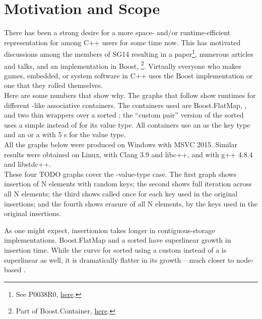 \section{Motivation and Scope}

There has been a strong desire for a more space- and/or runtime-efficient
representation for  among C++ users for some time now.  This has
motivated discussions among the members of SG14 resulting in a
paper\footnote{See P0038R0,
  \href{http://www.open-std.org/jtc1/sc22/wg21/docs/papers/2015/p0038r0.html}{here}.},
numerous articles and talks, and an implementation in Boost,
\footnote{Part of Boost.Container,
  \href{http://www.boost.org/doc/libs/1_61_0/doc/html/container.html}{here}.}.
Virtually everyone who makes games, embedded, or system software in C++ uses
the Boost implementation or one that they rolled themselves.\\

Here are some numbers that show why.  The graphs that follow show runtimes for
different -like associative containers.  The containers used are
Boost.FlatMap, , and two thin wrappers over a sorted ;
the ``custom pair'' version of the sorted  uses a simple
 instead of  for its value type.  All containers use
an  as the key type and an  or a  with 5
s for the value type.\\

All the graphs below were produced on Windows with MSVC 2015.  Similar results
were obtained on Linux, with Clang 3.9 and libc++, and with g++ 4.8.4 and
libstdc++.\\

These four TODO graphs cover the -value-type case.  The first graph
shows insertion of N elements with random keys; the second shows full
iteration across all N elements; the third shows  called once
for each key used in the original insertions; and the fourth shows erasure of
all N elements, by the keys used in the original insertions.


As one might expect, insertionion takes longer in contiguous-storage
implementations.  Boost.FlatMap and a sorted 
have superlinear growth in insertion time.  While the curve for sorted
 using a custom  instead of a  is
superlinear as well, it is dramatically flatter in its growth -- much closer
to node-based .

